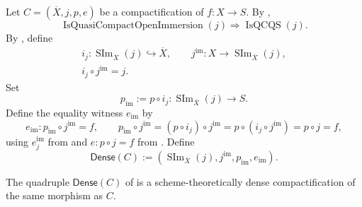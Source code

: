 \begin{definition}
  \label{def:nagata-dense-refinement}

  Let $C=(\overline X,j,p,e)$ be a compactification of $f\colon X\to S$.
  By ,
  \[
    \operatorname{IsQuasiCompactOpenImmersion}(j)
      \Longrightarrow\operatorname{IsQCQS}(j).                  \tag{DR-1}
  \]
  By
  ,
  define
  \[
  \begin{gathered}
    i_j\colon\operatorname{SIm}_{\overline X}(j)\hookrightarrow\overline X,
    \qquad
    j^{\mathrm{im}}\colon X\to\operatorname{SIm}_{\overline X}(j),\\
    i_j\circ j^{\mathrm{im}}=j.
  \end{gathered}                                                     \tag{DR-2}
  \]
  Set
  \[
    p_{\mathrm{im}}:=p\circ i_j
      \colon\operatorname{SIm}_{\overline X}(j)\to S.
  \]
  Define the equality witness $e_{\mathrm{im}}$ by
  \[
    e_{\mathrm{im}}\colon p_{\mathrm{im}}\circ j^{\mathrm{im}}=f,
    \qquad
    p_{\mathrm{im}}\circ j^{\mathrm{im}}
      =(p\circ i_j)\circ j^{\mathrm{im}}
      =p\circ(i_j\circ j^{\mathrm{im}})
      =p\circ j=f,
  \]
  using $e_j^{\mathrm{im}}$ from
   and $e\colon p\circ j=f$ from
  .  Define
  \[
    \mathsf{Dense}(C):=
      \left(\operatorname{SIm}_{\overline X}(j),
        j^{\mathrm{im}},p_{\mathrm{im}},e_{\mathrm{im}}\right).
  \]
\end{definition}

\begin{proposition}
  \label{prop:nagata-dense-refinement}

  The quadruple $\mathsf{Dense}(C)$ of
   is a scheme-theoretically dense
  compactification of the same morphism as $C$.
\end{proposition}

